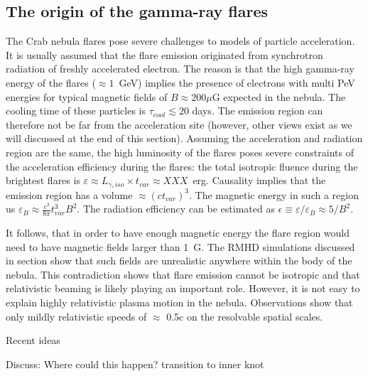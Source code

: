 \subsection{The origin of the gamma-ray flares}

The Crab nebula flares pose severe challenges to models of particle acceleration. It is usually assumed that the flare emission originated from synchrotron radiation of freshly accelerated electron. The reason is that the high gamma-ray energy of the flares ($\approx 1$~GeV) implies the presence of electrons with multi PeV energies for typical magnetic fields of $B \approx 200 \mu$G expected in the nebula. The cooling time of these particles is $\tau_{cool} \lesssim 20$ days. The emission region can therefore not be far from the acceleration site (however, other views exist as we will discussed at the end of this section). Assuming the acceleration and radiation region are the same, the high luminosity of the flares poses severe constraints of the acceleration efficiency during the flares: the total isotropic fluence during the brightest flares is $\varepsilon \approx L_{\gamma,iso} \times t_{var} \approx XXX $~erg. Causality implies that the emission region has a volume $\approx (c t_{var})^3$. The magnetic energy in such a region us $\varepsilon_B \approx \frac{c^3}{8 \pi} t_{var}^3 B^2$. The radiation efficiency can be estimated as $\epsilon \equiv \varepsilon / \varepsilon_B \approx  5 / B^2$. 

It follows, that in order to have enough magnetic energy the flare region would need to have magnetic fields larger than 1~G. The RMHD simulations discussed in section show that such fields are unrealistic anywhere within the body of the nebula.  This contradiction shows that flare emission cannot be isotropic and that relativistic beaming is likely playing an important role. However, it is not easy to explain highly relativistic plasma motion in the nebula. Observations show that only mildly relativistic speeds of $\approx$ 0.5c on the resolvable spatial scales.


Recent ideas  \cite{Bykov_2012}\cite{Cerutti_2014}\cite{2016arXiv160403179Y}\cite{2015arXiv151205426Z}\cite{2016arXiv160304850N}\cite{2016arXiv160305731L}

Discuss: Where could this happen? transition to inner knot